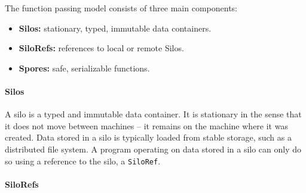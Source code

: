\documentclass[preprint]{sigplanconf}
\theoremstyle{definition}
\theoremstyle{definition}
\begin{document}
The function passing model consists of three main components:
\begin{itemize}[noitemsep]
  \item {\bf Silos:} stationary, typed, immutable data containers.
  \item {\bf SiloRefs:} references to local or remote Silos.
  \item {\bf Spores:} safe, serializable functions.
\end{itemize}
\vspace{1mm}

\paragraph{Silos}

A silo is a typed and immutable data container. It is stationary in the sense
that it does not move between machines -- it remains on the machine where it was
created. Data stored in a silo is typically loaded from stable storage, such as
a distributed file system. A program operating on data stored in a silo can only
do so using a reference to the silo, a \verb|SiloRef|.

\paragraph{SiloRefs}
\end{document}
